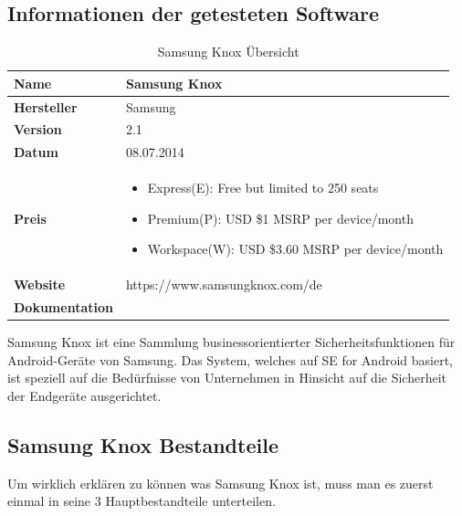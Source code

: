 \subsection{Informationen der getesteten Software}
\begin{table}[h]
\centering
\begin{tabular}{|l|p{10cm}|}
\hline
\textbf{Name}          & Samsung Knox                                                                                           \\ \hline
\textbf{Hersteller}    & Samsung
\\ \hline
\textbf{Version}       & 2.1
\\ \hline
\textbf{Datum}         & 08.07.2014                                                                                               \\ \hline
\textbf{Preis}         & 

\begin{itemize}
	\item Express(E): Free but limited to 250 seats
	\item Premium(P): USD \$1 MSRP per device/month
	\item Workspace(W): USD \$3.60 MSRP per device/month
\end{itemize}
                                                                                                          \\ \hline
\textbf{Website}       & https://www.samsungknox.com/de 
\\ \hline
\textbf{Dokumentation} &                                                                      \\ \hline
\end{tabular}
\caption{Samsung Knox Übersicht}
\end{table}

Samsung Knox ist eine Sammlung businessorientierter Sicherheitsfunktionen für Android-Geräte von Samsung. Das System, welches auf SE for Android basiert, ist speziell auf die Bedürfnisse von Unternehmen in Hinsicht auf die Sicherheit der Endgeräte ausgerichtet.

\subsection{Samsung Knox Bestandteile}
Um wirklich erklären zu können was Samsung Knox ist, muss man es zuerst einmal in seine 3 Hauptbestandteile unterteilen.
